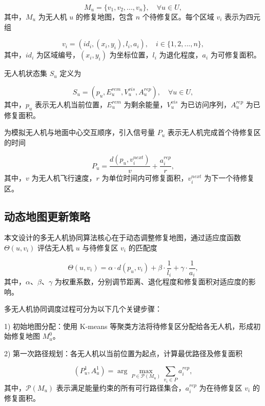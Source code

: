 \documentclass[AutoFakeBold]{LZUThesis}
\begin{document}
\begin{equation}
	M_u = \{v_1, v_2, ..., v_n\}, \quad \forall u \in U,
\end{equation}
其中，$M_u$ 为无人机 $u$ 的修复地图，包含 $n$ 个待修复区。每个区域 $v_i$ 表示为四元组

\begin{equation}
	v_i = (id_i, (x_i, y_i), l_i, a_i), \quad i \in \{1,2,...,n\},
\end{equation}
其中，$id_i$ 为区域编号，$(x_i, y_i)$ 为坐标位置，$l_i$ 为退化程度，$a_i$ 为可修复面积。

无人机状态集 $S_u$ 定义为

\begin{equation}
	S_u = (p_u, E_u^{rem}, V_u^{vis}, A_u^{rep}), \quad \forall u \in U,
\end{equation}
其中，$p_u$ 表示无人机当前位置，$E_u^{rem}$ 为剩余能量，$V_u^{vis}$ 为已访问序列，$A_u^{rep}$ 为已修复面积。

为模拟无人机与地面中心交互顺序，引入信号量 $P_u$ 表示无人机完成首个待修复区的时间

\begin{equation}
	P_u = \frac{d(p_u, v_i^{next})}{v} + \frac{a_i^{rep}}{r},
\end{equation}
其中，$v$ 为无人机飞行速度，$r$ 为单位时间内可修复面积，$v_i^{next}$ 为下一个待修复区。

\subsection{动态地图更新策略}

本文设计的多无人机协同算法核心在于动态调整修复地图，通过适应度函数 $\Theta(u,v_i)$ 评估无人机 $u$ 与待修复区 $v_i$ 的匹配度

\begin{equation}
	\Theta(u,v_i) = \alpha \cdot d(p_u, v_i) + \beta \cdot \frac{1}{l_i} + \gamma \cdot \frac{1}{a_i},
\end{equation}
其中，$\alpha$、$\beta$、$\gamma$ 为权重系数，分别调节距离、退化程度和修复面积对适应度的影响。

多无人机协同调度过程可分为以下几个关键步骤：

1) 初始地图分配：使用 K-means 等聚类方法将待修复区分配给各无人机，形成初始修复地图 $M_u^0$。

2) 第一次路径规划：各无人机以当前位置为起点，计算最优路径及修复面积

\begin{equation}
	(P_u^1, A_u^1) = \arg\max_{P \in \mathcal{P}(M_u)} \sum_{v_i \in P} a_i^{rep},
\end{equation}
其中，$\mathcal{P}(M_u)$ 表示满足能量约束的所有可行路径集合，$a_i^{rep}$ 为在待修复区 $v_i$ 的修复面积。
\end{document}
